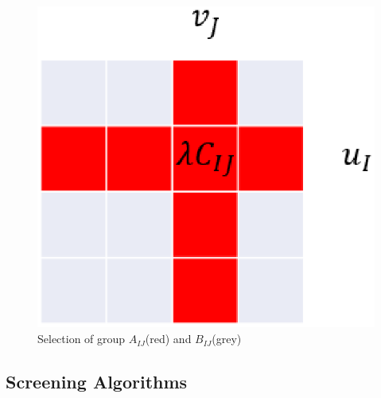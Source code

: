\documentclass[twoside]{article}
\theoremstyle{plain}
\begin{document}
\begin{figure}[h]
\begin{center}
\includegraphics[width = 0.7\linewidth]{pic/divide}
\caption{Selection of group $A_{IJ}$(red) and $B_{IJ}$(grey)}
\end{center}
\end{figure}




\subsection{Screening Algorithms}
\end{document}
